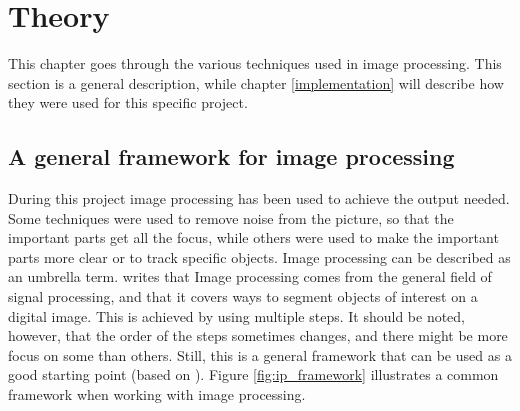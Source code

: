 \chapter{Theory}\label{theory_part}
This chapter goes through the various techniques used in image processing. This section is a general description, while chapter \ref{implementation} will describe how they were used for this specific project.

\section{A general framework for image processing}
During this project image processing has been used to achieve the output needed. Some techniques were used to remove noise from the picture, so that the important parts get all the focus, while others were used to make the important parts more clear or to track specific objects. Image processing can be described as an umbrella term. \citep{ip_book} writes that Image processing comes from the general field of signal processing, and that it covers ways to segment objects of interest on a digital image. This is achieved by using multiple steps. It should be noted, however, that the order of the steps sometimes changes, and there might be more focus on some than others. Still, this is a general framework that can be used as a good starting point (based on \citep{ip_book}). Figure \ref{fig:ip_framework} illustrates a common framework when working with image processing.






